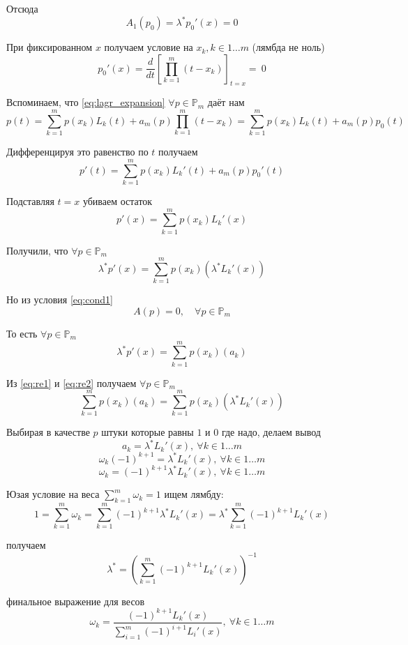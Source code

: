 \documentclass[12pt,a4paper]{article}
\begin{document}
	\noindent Отсюда 
	\[A_1(p_0) = \lambda^* p_0'(x) =  0\]
	
	\noindent При фиксированном $x$ получаем условие на $x_k, k \in 1 \ldots m$ (лямбда не ноль)
	\[
	p_0'(x) = \frac{d}{dt} \left[\prod_{k=1}^{m} (t - x_k) \right]_{t=x} = \ 0
	\]
	
	\noindent Вспоминаем, что \eqref{eq:lagr_expansion}  $\forall p \in \mathbb{P}_m$ даёт нам
	\[
	p(t) = 
	\sum_{k=1}^{m} p(x_k) L_k(t) + 
	a_m(p) \prod_{k=1}^{m} (t-x_k) = 
	\sum_{k=1}^{m} p(x_k) L_k(t) + 
	a_m(p) p_0(t)
	\]
	
	\noindent Дифференцируя это равенство по $t$ получаем 
	\[
	p'(t) = 
	\sum_{k=1}^{m} p(x_k) L_k'(t) + 
	a_m(p) p_0'(t)
	\]
	
	\noindent Подставляя $t=x$ убиваем остаток
	\[
	p'(x) = 
	\sum_{k=1}^{m} p(x_k) L_k'(x)
	\]
	
	\noindent Получили, что $\forall p \in \mathbb{P}_m$
	\begin{equation}
	\lambda^* p'(x) = 
	\sum_{k=1}^{m} p(x_k) ( \lambda^* L_k'(x) ) 
	\label{eq:re1}
	\end{equation}
	
	\noindent Но из условия \eqref{eq:cond1} 
	\[
	A(p) = 0, \quad \forall p \in \mathbb{P}_m
	\]
	
	\noindent То есть $\forall p \in \mathbb{P}_m$
	\begin{equation}
	\lambda^* p'(x) = 
	\sum_{k=1}^{m} p(x_k) ( a_k ) 
	\label{eq:re2}
	\end{equation}
	
	\noindent Из \eqref{eq:re1} и \eqref{eq:re2} получаем $\forall p \in \mathbb{P}_m$
	\[
	\sum_{k=1}^{m} p(x_k) ( a_k ) = \sum_{k=1}^{m} p(x_k) ( \lambda^* L_k'(x) ) 
	\] 
	
	\noindent Выбирая в качестве $p$ штуки которые равны $1$ и $0$ где надо, делаем вывод
	\[
	a_k = \lambda^* L_k'(x), \ \forall k \in 1 \ldots m 
	\]
	\[
	\omega_k (-1)^{k+1} = \lambda^* L_k'(x), \ \forall k \in 1 \ldots m 
	\]
	\[
	\omega_k  = (-1)^{k+1} \lambda^* L_k'(x), \ \forall k \in 1 \ldots m 
	\]
	
	
	\noindent Юзая условие на веса $\sum_{k=1}^{m} \omega_k = 1$ ищем лямбду:
	\[
	1 = \sum_{k=1}^{m} \omega_k = \sum_{k=1}^{m} (-1)^{k+1} \lambda^* L_k'(x) = \lambda^* \sum_{k=1}^{m} (-1)^{k+1}  L_k'(x)
	\]
	
	\noindent получаем
	\[
	\lambda^* = \left( \sum_{k=1}^{m} (-1)^{k+1}  L_k'(x) \right) ^ {-1}
	\]
	
	\noindent финальное выражение для весов
	\[
	\omega_k  = 
	\frac
	{
		(-1)^{k+1} L_k'(x)
	}
	{
		\sum_{i=1}^{m} (-1)^{i+1}  L_i'(x)
	}, \ \forall k \in 1 \ldots m 
	\]
	
\end{document}
